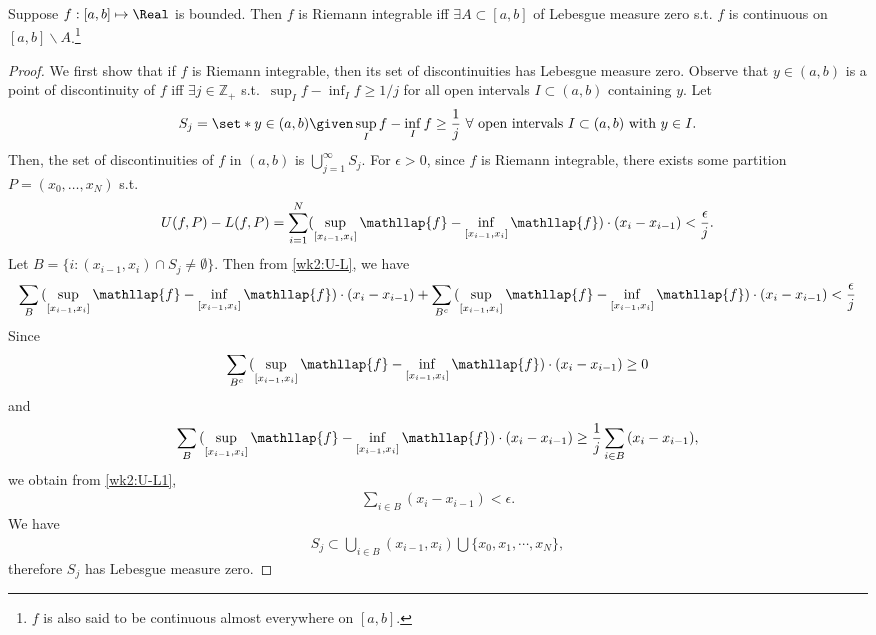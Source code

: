 \documentclass[../aipt.tex]{subfiles}
\begin{document}
\begin{Theorem}\label{thm:RiemannIntegrable}
Suppose $f:[a,b]\mapsto \Real$ is bounded. Then $f$ is Riemann integrable iff $\exists A \subset [a,b]$ of Lebesgue measure zero s.t. $f$ is continuous on $[a,b]\backslash A$.\footnote{$f$ is also said to be continuous almost everywhere on $[a,b]$.}
\end{Theorem}
\begin{proof}
We first show that if $f$ is Riemann integrable, then its set of discontinuities has Lebesgue measure zero. Observe that $y \in (a,b)$ is a point of discontinuity of $f$ iff $\exists j \in \mathbb{Z}_{+}$ s.t.\ $\sup_{I}{f}-\inf_{I}{f}\geq 1/j$ for all open intervals $I \subset (a,b)$ containing $y$. Let 
\begin{align*}
S_j=\set*{y\in(a,b) \given \sup_I{f}-\inf_I{f}\geq \frac{1}{j}\ \forall\ \text{open intervals $I\subset(a,b)$ with $y\in I$}}.
\end{align*}
Then, the set of discontinuities of $f$ in $(a,b)$ is $\bigcup^{\infty}_{j=1}{S_j}$. For $\epsilon >0$, since $f$ is Riemann integrable, there exists some partition $P=(x_0,\ldots,x_N)$ s.t.
\begin{align}\label{wk2:U-L}
U(f,P)-L(f,P)=\sum_{i=1}^N (\sup_{[x_{i-1},x_i]}\mathllap{f}-\inf_{[x_{i-1},x_i]}\mathllap{f})\cdot(x_i-x_{i-1}) < \frac{\epsilon}{j}.
\end{align}
Let $B=\{i:(x_{i-1},x_i)\cap S_j\neq\emptyset\}$. Then from \cref{wk2:U-L}, we have
\begin{align}\label{wk2:U-L1}
\sum_{B}{(\sup_{[x_{i-1},x_i]}\mathllap{f}-\inf_{[x_{i-1},x_i]}\mathllap{f})\cdot(x_i-x_{i-1})}+\sum_{B^c}{(\sup_{[x_{i-1},x_i]}\mathllap{f}-\inf_{[x_{i-1},x_i]}\mathllap{f})\cdot(x_i-x_{i-1})}<\frac{\epsilon}{j}
\end{align}
Since 
\begin{align*}
\sum_{B^c}{(\sup_{[x_{i-1},x_i]}\mathllap{f}-\inf_{[x_{i-1},x_i]}\mathllap{f})\cdot(x_i-x_{i-1})}\geq 0
\end{align*}
and
\begin{align*}
\sum_{B}{(\sup_{[x_{i-1},x_i]}\mathllap{f}-\inf_{[x_{i-1},x_i]}\mathllap{f})\cdot(x_i-x_{i-1})}\geq \frac{1}{j}\sum_{i\in B}{(x_i-x_{i-1})},
\end{align*}
we obtain from \cref{wk2:U-L1},
\begin{align*}
\sum_{i\in B}{(x_i-x_{i-1})}<\epsilon.
\end{align*}
We have
\begin{align*}
S_j\subset \bigcup_{i\in B}(x_{i-1},x_i)\bigcup\{x_0,x_1,\cdots,x_N\},
\end{align*}
therefore $S_j$ has Lebesgue measure zero.


\end{proof}
\end{document}
